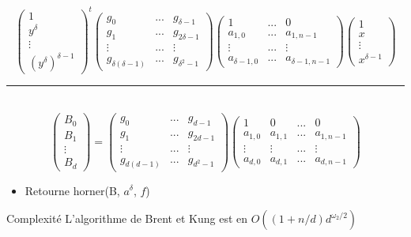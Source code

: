 \documentclass[10pt,a4paper]{beamer}
\begin{document}
\begin{frame}
    \[
    \begin{pmatrix}
        1 \\
        y^\delta \\
        \vdots \\
        (y^\delta)^{\delta-1} 
    \end{pmatrix}^t
    \begin{pmatrix}
        g_0 & ... & g_{\delta-1} \\
        g_1 & ... & g_{2\delta-1} \\
        \vdots & ... & \vdots \\
        g_{\delta(\delta-1)} & ... & g_{\delta^2-1}
    \end{pmatrix}
    \begin{pmatrix}
        1 &  ... & 0 \\
        a_{1,0} & ... & a_{1,n-1} \\
        \vdots &  ... & \vdots \\
        a_{\delta-1,0} & ... & a_{\delta-1,n-1}
    \end{pmatrix}
    \begin{pmatrix}
        1 \\
        x \\
        \vdots \\
        x^{\delta-1}
    \end{pmatrix}
    \]
    \rule{\linewidth}{0.2mm}\\[0.5cm]
    \[
    \begin{pmatrix}
        B_0 \\
        B_1 \\
        \vdots \\
        B_d
    \end{pmatrix}
    =
    \begin{pmatrix}
        g_0 & ... & g_{d-1} \\
        g_1 & ... & g_{2d-1} \\
        \vdots & ... & \vdots \\
        g_{d(d-1)} & ... & g_{d^2-1}
    \end{pmatrix}
    \begin{pmatrix}
        1 & 0 & ... & 0 \\
        a_{1,0} & a_{1,1} & ... & a_{1,n-1} \\
        \vdots & \vdots & ... & \vdots \\
        a_{d,0} & a_{d,1} & ... & a_{d,n-1}
    \end{pmatrix} 
    \]
    \begin{itemize} 
        \item Retourne horner(B, $a^{\delta}$, $f$)
    \end{itemize}
    \begin{alertblock}{Complexité}
        L'algorithme de Brent et Kung est en $O((1+n/d)d^{\omega_2/2})$
    \end{alertblock}
\end{frame}
\end{document}
